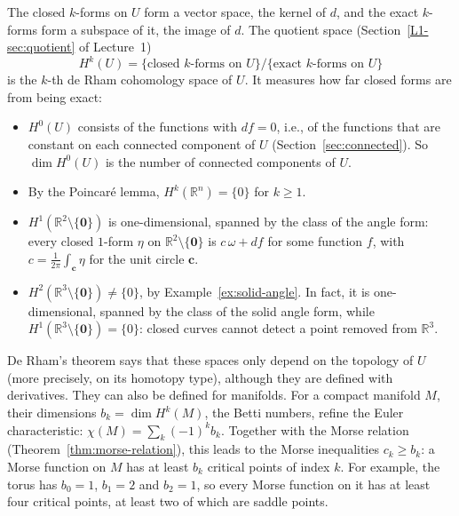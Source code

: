 \documentclass[11pt]{article}
\theoremstyle{definition}
\theoremstyle{plain}
\theoremstyle{remark}
\begin{document}
The closed $k$-forms on $U$ form a vector space, the kernel of $d$, and the exact $k$-forms form a subspace of it, the image of $d$. The quotient space (Section~\ref{L1-sec:quotient} of Lecture~1)
\[H^k(U) = \{\text{closed } k\text{-forms on } U\} / \{\text{exact } k\text{-forms on } U\}\]
is the $k$-th de Rham cohomology space of $U$. It measures how far closed forms are from being exact:
\begin{itemize}
    \item $H^0(U)$ consists of the functions with $df = 0$, i.e., of the functions that are constant on each connected component of $U$ (Section~\ref{sec:connected}). So $\dim H^0(U)$ is the number of connected components of $U$.
    \item By the Poincar\'e lemma, $H^k(\mathbb{R}^n) = \{0\}$ for $k \geq 1$.
    \item $H^1(\mathbb{R}^2 \setminus \{\mathbf{0}\})$ is one-dimensional, spanned by the class of the angle form: every closed $1$-form $\eta$ on $\mathbb{R}^2 \setminus \{\mathbf{0}\}$ is $c\,\omega + df$ for some function $f$, with $c = \frac{1}{2\pi}\int_{\mathbf{c}} \eta$ for the unit circle $\mathbf{c}$.
    \item $H^2(\mathbb{R}^3 \setminus \{\mathbf{0}\}) \neq \{0\}$, by Example~\ref{ex:solid-angle}. In fact, it is one-dimensional, spanned by the class of the solid angle form, while $H^1(\mathbb{R}^3 \setminus \{\mathbf{0}\}) = \{0\}$: closed curves cannot detect a point removed from $\mathbb{R}^3$.
\end{itemize}
De Rham's theorem says that these spaces only depend on the topology of $U$ (more precisely, on its homotopy type), although they are defined with derivatives. They can also be defined for manifolds. For a compact manifold $M$, their dimensions $b_k = \dim H^k(M)$, the Betti numbers, refine the Euler characteristic: $\chi(M) = \sum_k (-1)^k b_k$. Together with the Morse relation (Theorem~\ref{thm:morse-relation}), this leads to the Morse inequalities $c_k \geq b_k$: a Morse function on $M$ has at least $b_k$ critical points of index $k$. For example, the torus has $b_0 = 1$, $b_1 = 2$ and $b_2 = 1$, so every Morse function on it has at least four critical points, at least two of which are saddle points.
\end{document}
